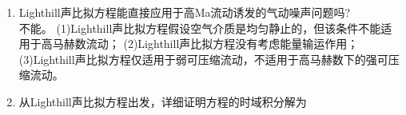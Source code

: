 \begin{enumerate}
    \item Lighthill声比拟方程能直接应用于高Ma流动诱发的气动噪声问题吗? \\
        不能。
        (1)Lighthill声比拟方程假设空气介质是均匀静止的，但该条件不能适用于高马赫数流动；
        (2)Lighthill声比拟方程没有考虑能量输运作用；
        (3)Lighthill声比拟方程仅适用于弱可压缩流动，不适用于高马赫数下的强可压缩流动。


    \item 从Lighthill声比拟方程出发，详细证明方程的时域积分解为

\end{enumerate}
